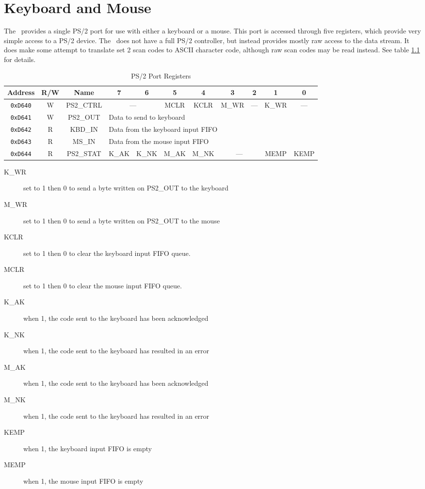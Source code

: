 \chapter{Keyboard and Mouse}

The \jr\ provides a single PS/2 port for use with either a keyboard or a mouse. This port is accessed through five registers, which provide very simple access to a PS/2 device. The \jr\ does not have a full PS/2 controller, but instead provides mostly raw access to the data stream. It does make some attempt to translate set 2 scan codes to ASCII character code, although raw scan codes may be read instead. See table \ref{tab:ps2_reg} for details.

\begin{table}[ht]
    \begin{center}
        \begin{tabular}{|c|c|c|c|c|c|c|c|c|c|c|} \hline
            Address & R/W & Name & 7 & 6 & 5 & 4 & 3 & 2 & 1 & 0 \\\hline\hline
            \verb+0xD640+ & W & PS2\_CTRL & \multicolumn{2}{|c|}{---} & MCLR & KCLR & M\_WR & --- & K\_WR & --- \\\hline
            \verb+0xD641+ & W & PS2\_OUT & \multicolumn{8}{|l|}{Data to send to keyboard} \\ \hline
            \verb+0xD642+ & R & KBD\_IN & \multicolumn{8}{|l|}{Data from the keyboard input FIFO} \\ \hline
            \verb+0xD643+ & R & MS\_IN & \multicolumn{8}{|l|}{Data from the mouse input FIFO} \\ \hline
            \verb+0xD644+ & R & PS2\_STAT & K\_AK & K\_NK & M\_AK & M\_NK & \multicolumn{2}{|c|}{---} & MEMP & KEMP \\ \hline
        \end{tabular}
    \end{center}
    \caption{PS/2 Port Registers}
    \label{tab:ps2_reg}
\end{table}

\begin{description}
    \item[K\_WR] set to 1 then 0 to send a byte written on PS2\_OUT to the keyboard
    \item[M\_WR] set to 1 then 0 to send a byte written on PS2\_OUT to the mouse
    \item[KCLR] set to 1 then 0 to clear the keyboard input FIFO queue.
    \item[MCLR] set to 1 then 0 to clear the mouse input FIFO queue. 
    \item[K\_AK] when 1, the code sent to the keyboard has been acknowledged
    \item[K\_NK] when 1, the code sent to the keyboard has resulted in an error
    \item[M\_AK] when 1, the code sent to the keyboard has been acknowledged
    \item[M\_NK] when 1, the code sent to the keyboard has resulted in an error
    \item[KEMP] when 1, the keyboard input FIFO is empty
    \item[MEMP] when 1, the mouse input FIFO is empty 
\end{description}

